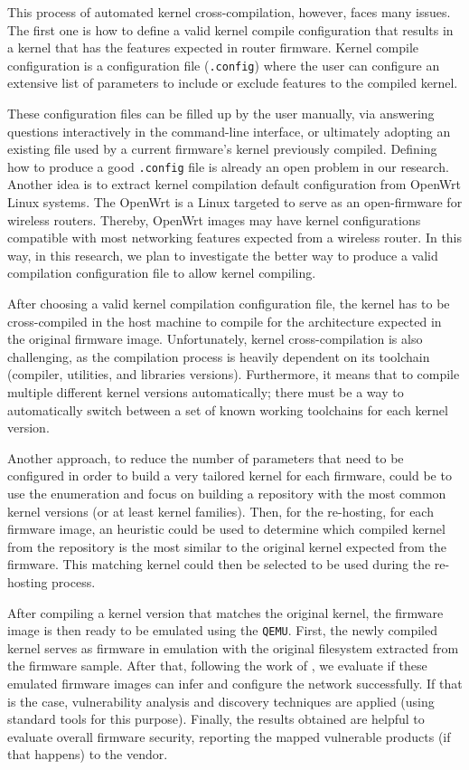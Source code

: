 This process of automated kernel cross-compilation, however, faces many issues. The first one is how to define a valid kernel compile configuration that results in a kernel that has the features expected in router firmware. Kernel compile configuration is a configuration file ({\tt .config}) where the user can configure an extensive list of parameters to include or exclude features to the compiled kernel.

These configuration files can be filled up by the user manually, via answering questions interactively in the command-line interface, or ultimately adopting an existing file used by a current firmware's kernel previously compiled. Defining how to produce a good {\tt .config} file is already an open problem in our research. Another idea is to extract kernel compilation default configuration from OpenWrt Linux systems. The OpenWrt is a Linux targeted to serve as an open-firmware for wireless routers. Thereby, OpenWrt images may have kernel configurations compatible with most networking features expected from a wireless router. In this way, in this research, we plan to investigate the better way to produce a valid compilation configuration file to allow kernel compiling.

After choosing a valid kernel compilation configuration file, the kernel has to be cross-compiled in the host machine to compile for the architecture expected in the original firmware image. Unfortunately, kernel cross-compilation is also challenging, as the compilation process is heavily dependent on its toolchain (compiler, utilities, and libraries versions). Furthermore, it means that to compile multiple different kernel versions automatically; there must be a way to automatically switch between a set of known working toolchains for each kernel version.

Another approach, to reduce the number of parameters that need to be configured in order to build a very tailored kernel for each firmware, could be to use the enumeration and focus on building a repository with the most common kernel versions (or at least kernel families). Then, for the re-hosting, for each firmware image, an heuristic could be used to determine which compiled kernel from the repository is the most similar to the original kernel expected from the firmware. This matching kernel could then be selected to be used during the re-hosting process.

After compiling a kernel version that matches the original kernel, the firmware image is then ready to be emulated using the {\tt QEMU}. First, the newly compiled kernel serves as firmware in emulation with the original filesystem extracted from the firmware sample. After that, following the work of \cite{firmadyne}, we evaluate if these emulated firmware images can infer and configure the network successfully. If that is the case, vulnerability analysis and discovery techniques are applied (using standard tools for this purpose). Finally, the results obtained are helpful to evaluate overall firmware security, reporting the mapped vulnerable products (if that happens) to the vendor.

